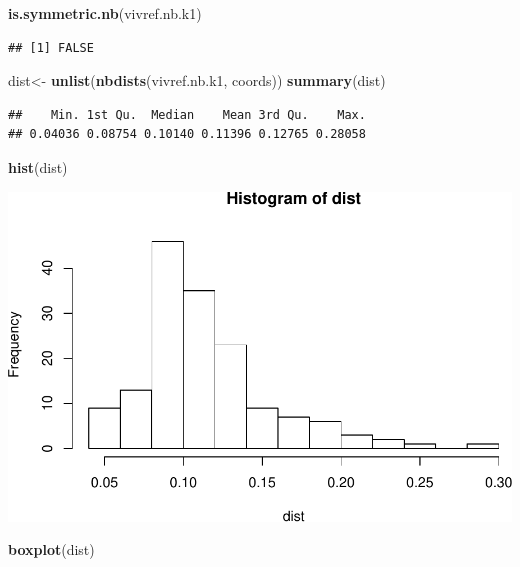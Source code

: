 \documentclass[11pt,]{article}
\newenvironment{Shaded}{\begin{snugshade}}{\end{snugshade}}
\newcommand{\KeywordTok}[1]{\textcolor[rgb]{0.13,0.29,0.53}{\textbf{#1}}}
\newcommand{\StringTok}[1]{\textcolor[rgb]{0.31,0.60,0.02}{#1}}
\newcommand{\NormalTok}[1]{#1}
\begin{document}
\begin{Shaded}
\begin{Highlighting}[]
\KeywordTok{is.symmetric.nb}\NormalTok{(vivref.nb.k1)}
\end{Highlighting}
\end{Shaded}

\begin{verbatim}
## [1] FALSE
\end{verbatim}

\begin{Shaded}
\begin{Highlighting}[]
\NormalTok{dist<-}\StringTok{ }\KeywordTok{unlist}\NormalTok{(}\KeywordTok{nbdists}\NormalTok{(vivref.nb.k1, coords))}
\KeywordTok{summary}\NormalTok{(dist)}
\end{Highlighting}
\end{Shaded}

\begin{verbatim}
##    Min. 1st Qu.  Median    Mean 3rd Qu.    Max. 
## 0.04036 0.08754 0.10140 0.11396 0.12765 0.28058
\end{verbatim}

\begin{Shaded}
\begin{Highlighting}[]
\KeywordTok{hist}\NormalTok{(dist)}
\end{Highlighting}
\end{Shaded}

\includegraphics{proyecto_files/figure-latex/unnamed-chunk-2-4.pdf}

\begin{Shaded}
\begin{Highlighting}[]
\KeywordTok{boxplot}\NormalTok{(dist)}
\end{Highlighting}
\end{Shaded}
\end{document}
